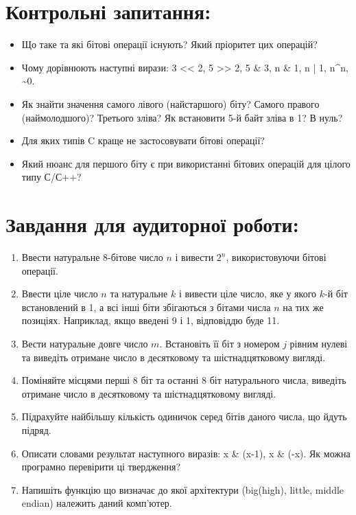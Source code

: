 \documentclass[a5paper,titlepage,openany,twoside,draft]{book_unv}%
\begin{document}
\section{Контрольні запитання:}
\begin{itemize}
\item
  Що таке та які бітові операції існують? Який пріоритет цих операцій?
\item
  Чому дорівнюють наступні вирази:
  3 \textless{}\textless{} 2, 5 \textgreater{}\textgreater{} 2, 5 \& 3, 
n \& 1, n | 1, n\textasciicircum{}n, \textasciitilde{}0.
\item
  Як знайти значення самого лівого (найстаршого) біту? 
Самого правого (наймолодшого)? Третього зліва?
  Як встановити 5-й байт зліва в 1? В нуль?
\item
  Для яких типів C краще не застосовувати бітові операції?
\item
  Який нюанс для першого біту є при використанні бітових операцій для
  цілого типу С/С++?
\end{itemize}

\section{Завдання для аудиторної роботи:}

\begin{enumerate}
\def\labelenumi{\arabic{enumi})}
\item
  Ввести натуральне 8-бітове число $n$ і вивести $2^{n}$, використовуючи бітові операції.
\item
  Ввести ціле число $n$ та натуральне $k$ і вивести ціле число, яке у якого
  $k$-й біт встановлений в 1, а всі інші біти збігаються з бітами числа $n$
  на тих же позиціях. Наприклад, якщо введені 9 і 1, відповіддю буде 11.
\item
  Вести натуральне довге число $m$. Встановіть її біт
  з номером $j$ рівним нулеві та виведіть отримане число в десятковому та
  шістнадцятковому вигляді.
\item
  Поміняйте місцями перші 8 біт та останні 8 біт натурального числа,
  виведіть отримане число в десятковому та шістнадцятковому вигляді.
\item
  Підрахуйте найбільшу кількість одиничок серед бітів даного числа, що
  йдуть підряд.
\item
  Описати словами результат наступного виразів: x \& (x-1), x \& (-x). 
Як можна програмно перевірити ці твердження?
\item
  Напишіть функцію що визначає до якої архітектури (big(high), little, middle
  endian) належить даний комп'ютер.
\end{enumerate}
\end{document}
